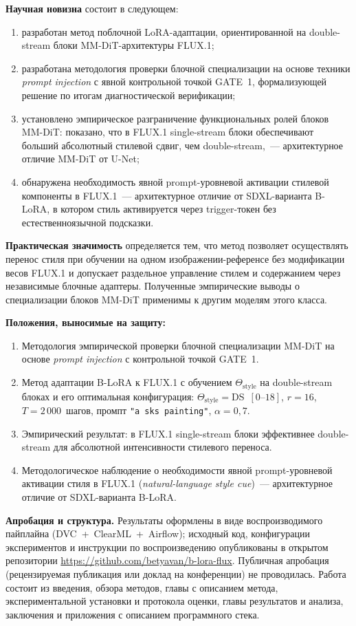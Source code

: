 \textbf{Научная новизна} состоит в следующем:
\begin{enumerate}\itemsep0.2em
    \item разработан метод поблочной LoRA-адаптации, ориентированной на double-stream блоки MM-DiT-архитектуры FLUX.1;
    \item разработана методология проверки блочной специализации на основе техники \textit{prompt injection} с явной контрольной точкой GATE~1, формализующей решение по итогам диагностической верификации;
    \item установлено эмпирическое разграничение функциональных ролей блоков MM-DiT: показано, что в FLUX.1 single-stream блоки обеспечивают больший абсолютный стилевой сдвиг, чем double-stream,~--- архитектурное отличие MM-DiT от U-Net;
    \item обнаружена необходимость явной prompt-уровневой активации стилевой компоненты в FLUX.1~--- архитектурное отличие от SDXL-варианта B-LoRA, в котором стиль активируется через trigger-токен без естественноязычной подсказки.
\end{enumerate}

\textbf{Практическая значимость} определяется тем, что метод позволяет осуществлять перенос стиля при обучении на одном изображении-референсе без модификации весов FLUX.1 и допускает раздельное управление стилем и содержанием через независимые блочные адаптеры. Полученные эмпирические выводы о специализации блоков MM-DiT применимы к другим моделям этого класса.

\textbf{Положения, выносимые на защиту:}
\begin{enumerate}\itemsep0.2em
    \item Методология эмпирической проверки блочной специализации MM-DiT на основе \textit{prompt injection} с контрольной точкой GATE~1.
    \item Метод адаптации B-LoRA к FLUX.1 с обучением $\Theta_\text{style}$ на double-stream блоках и его оптимальная конфигурация: $\Theta_\text{style}{=}$DS~$[0\text{--}18]$, $r{=}16$, $T{=}2\,000$~шагов, промпт \texttt{"a sks painting"}, $\alpha{=}0{,}7$.
    \item Эмпирический результат: в FLUX.1 single-stream блоки эффективнее double-stream для абсолютной интенсивности стилевого переноса.
    \item Методологическое наблюдение о необходимости явной prompt-уровневой активации стиля в FLUX.1 (\textit{natural-language style cue})~--- архитектурное отличие от SDXL-варианта B-LoRA.
\end{enumerate}

\textbf{Апробация и структура.} Результаты оформлены в виде воспроизводимого пайплайна (DVC~+~ClearML~+~Airflow); исходный код, конфигурации экспериментов и инструкции по воспроизведению опубликованы в открытом репозитории \url{https://github.com/betyavan/b-lora-flux}. Публичная апробация (рецензируемая публикация или доклад на конференции) не проводилась. Работа состоит из введения, обзора методов, главы с описанием метода, экспериментальной установки и протокола оценки, главы результатов и анализа, заключения и приложения с описанием программного стека.
